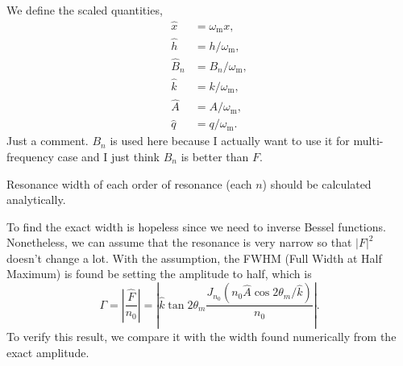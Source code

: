 We define the scaled quantities,
\begin{align}
      \hat x &= \omega_{\mathrm{m}} x, \\
      \hat h &= h/\omega_{\mathrm{m}}, \\
      \hat B_n &= B_n/\omega_{\mathrm{m}}, \\
      \hat k &= k/\omega_{\mathrm{m}}, \\
      \hat A &= A/\omega_{\mathrm{m}}, \\
      \hat q &= q/\omega_{\mathrm{m}} .
\end{align}
Just a comment. $B_n$ is used here because I actually want to use it for multi-frequency case and I just think $B_n$ is better than $F$.

















Resonance width of each order of resonance (each $n$) should be calculated analytically.


To find the exact width is hopeless since we need to inverse Bessel functions. Nonetheless, we can assume that the resonance is very narrow so that $\left\lvert F \right\rvert^2$ doesn't change a lot. With the assumption, the FWHM (Full Width at Half Maximum) is found be setting the amplitude to half, which is
\begin{equation}
   \Gamma = \left\lvert \frac{\hat F}{n_0} \right\rvert = \left\lvert \hat k \tan 2\theta_m \frac{ J_{n_0}( n_0 \hat A \cos 2\theta_m/\hat k )}{n_0} \right\rvert .
\end{equation}
To verify this result, we compare it with the width found numerically from the exact amplitude.

